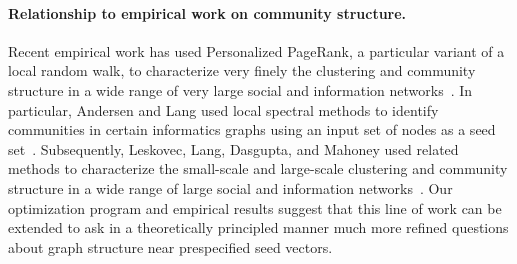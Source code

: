 \documentclass[11pt]{article}
\begin{document}
\paragraph{Relationship to empirical work on community structure.}
Recent empirical work has used Personalized PageRank, a particular variant 
of a local random walk, to characterize very finely the clustering and 
community structure in a wide range of very large social and information 
networks~\cite{andersen06seed,LLDM08_communities_CONF,LLDM09_communities_IM,LLM10_communities_CONF}. 
In particular, Andersen and Lang used local spectral methods to identify 
communities in certain informatics graphs using an input set of nodes as a 
seed set~\cite{andersen06seed}.
Subsequently, Leskovec, Lang, Dasgupta, and Mahoney used related 
methods to characterize the small-scale and large-scale clustering and 
community structure in a wide range of large social and information 
networks~\cite{LLDM08_communities_CONF,LLDM09_communities_IM,LLM10_communities_CONF}. 
Our optimization program and empirical results suggest that this line of 
work can be extended to ask in a theoretically principled manner much more 
refined questions about graph structure near prespecified seed vectors. 
\end{document}
